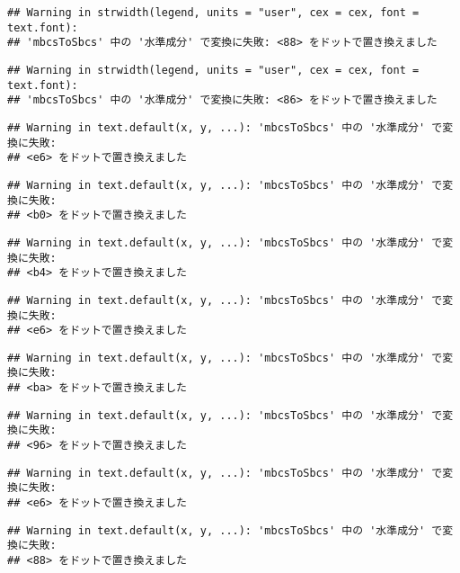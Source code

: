 \documentclass[]{article}
\begin{document}
\begin{verbatim}
## Warning in strwidth(legend, units = "user", cex = cex, font = text.font):
## 'mbcsToSbcs' 中の '水準成分' で変換に失敗: <88> をドットで置き換えました
\end{verbatim}

\begin{verbatim}
## Warning in strwidth(legend, units = "user", cex = cex, font = text.font):
## 'mbcsToSbcs' 中の '水準成分' で変換に失敗: <86> をドットで置き換えました
\end{verbatim}

\begin{verbatim}
## Warning in text.default(x, y, ...): 'mbcsToSbcs' 中の '水準成分' で変換に失敗:
## <e6> をドットで置き換えました
\end{verbatim}

\begin{verbatim}
## Warning in text.default(x, y, ...): 'mbcsToSbcs' 中の '水準成分' で変換に失敗:
## <b0> をドットで置き換えました
\end{verbatim}

\begin{verbatim}
## Warning in text.default(x, y, ...): 'mbcsToSbcs' 中の '水準成分' で変換に失敗:
## <b4> をドットで置き換えました
\end{verbatim}

\begin{verbatim}
## Warning in text.default(x, y, ...): 'mbcsToSbcs' 中の '水準成分' で変換に失敗:
## <e6> をドットで置き換えました
\end{verbatim}

\begin{verbatim}
## Warning in text.default(x, y, ...): 'mbcsToSbcs' 中の '水準成分' で変換に失敗:
## <ba> をドットで置き換えました
\end{verbatim}

\begin{verbatim}
## Warning in text.default(x, y, ...): 'mbcsToSbcs' 中の '水準成分' で変換に失敗:
## <96> をドットで置き換えました
\end{verbatim}

\begin{verbatim}
## Warning in text.default(x, y, ...): 'mbcsToSbcs' 中の '水準成分' で変換に失敗:
## <e6> をドットで置き換えました
\end{verbatim}

\begin{verbatim}
## Warning in text.default(x, y, ...): 'mbcsToSbcs' 中の '水準成分' で変換に失敗:
## <88> をドットで置き換えました
\end{verbatim}
\end{document}
